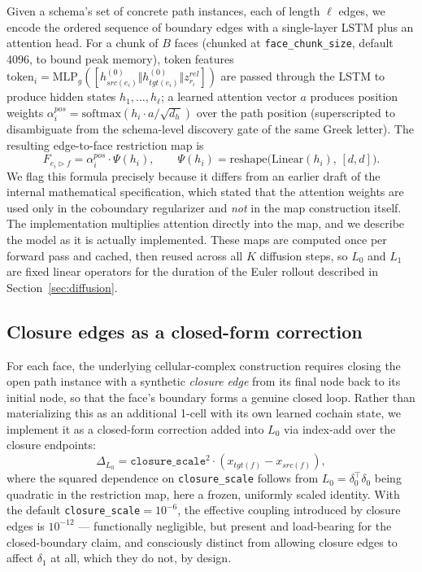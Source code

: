 \documentclass{article}
\begin{document}
Given a schema's set of concrete path instances, each of length $\ell$ edges, we encode the ordered
sequence of boundary edges with a single-layer LSTM plus an attention head. For a chunk of $B$
faces (chunked at \texttt{face\_chunk\_size}, default 4096, to bound peak memory), token features
$\mathrm{token}_i = \mathrm{MLP}_g([h^{(0)}_{src(e_i)} \Vert h^{(0)}_{tgt(e_i)} \Vert
z^{rel}_{r_i}])$ are passed through the LSTM to produce hidden states $h_1,\dots,h_\ell$; a learned
attention vector $a$ produces position weights $\alpha_i^{pos} = \mathrm{softmax}(h_i \cdot a /
\sqrt{d_h})$ over the path position (superscripted to disambiguate from the schema-level discovery
gate of the same Greek letter). The resulting edge-to-face restriction map is
\begin{equation}
  F_{e_i\triangleright f} = \alpha_i^{pos} \cdot \Psi(h_i), \qquad \Psi(h_i) = \mathrm{reshape}\big(\mathrm{Linear}(h_i),\, [d,d]\big).
  \label{eq:edge-to-face}
\end{equation}
We flag this formula precisely because it differs from an earlier draft of the internal
mathematical specification, which stated that the attention weights are used only in the
coboundary regularizer and \emph{not} in the map construction itself. The implementation multiplies
attention directly into the map, and we describe the model as it is actually implemented. These
maps are computed once per forward pass and cached, then reused across all $K$ diffusion steps, so
$L_0$ and $L_1$ are fixed linear operators for the duration of the Euler rollout described in
Section~\ref{sec:diffusion}.

\subsection{Closure edges as a closed-form correction}

For each face, the underlying cellular-complex construction requires closing the open path instance
with a synthetic \emph{closure edge} from its final node back to its initial node, so that the
face's boundary forms a genuine closed loop. Rather than materializing this as an additional 1-cell
with its own learned cochain state, we implement it as a closed-form correction added into $L_0$
via index-add over the closure endpoints:
\begin{equation}
  \Delta_{L_0} = \texttt{closure\_scale}^2 \cdot (x_{tgt(f)} - x_{src(f)}),
\end{equation}
where the squared dependence on \texttt{closure\_scale} follows from $L_0 = \delta_0^\top \delta_0$
being quadratic in the restriction map, here a frozen, uniformly scaled identity. With the default
\texttt{closure\_scale}$=10^{-6}$, the effective coupling introduced by closure edges is
$10^{-12}$ --- functionally negligible, but present and load-bearing for the closed-boundary claim,
and consciously distinct from allowing closure edges to affect $\delta_1$ at all, which they do
not, by design.
\end{document}

